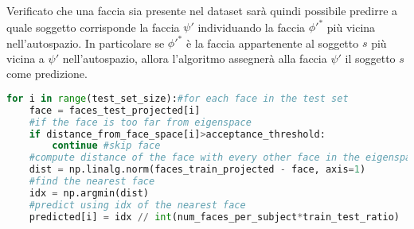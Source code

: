 Verificato che una faccia sia presente nel dataset sarà quindi possibile predirre a quale soggetto corrisponde la faccia \(\psi'\) individuando la faccia \(\phi'^*\) più vicina nell'autospazio. In particolare se \(\phi'^*\) è la faccia appartenente al soggetto \(s\) più vicina a \(\psi'\) nell'autospazio, allora l'algoritmo assegnerà alla faccia \(\psi'\) il soggetto \(s\) come predizione. 
\begin{lstlisting}[language = Python]
for i in range(test_set_size):#for each face in the test set
    face = faces_test_projected[i]
    #if the face is too far from eigenspace
    if distance_from_face_space[i]>acceptance_threshold: 
        continue #skip face
    #compute distance of the face with every other face in the eigenspace
    dist = np.linalg.norm(faces_train_projected - face, axis=1) 
    #find the nearest face
    idx = np.argmin(dist) 
    #predict using idx of the nearest face
    predicted[i] = idx // int(num_faces_per_subject*train_test_ratio) 
\end{lstlisting}
